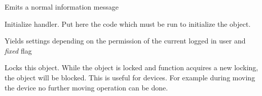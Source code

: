 \documentclass[letterpaper,10pt,english]{sphinxmanual}
\begin{document}
\begin{fulllineitems}

\begin{fulllineitems}
\label{command:pyfrid.core.command.BaseThreadedCommand.has_info}
\end{fulllineitems}


\begin{fulllineitems}
\label{command:pyfrid.core.command.BaseThreadedCommand.has_warning}
\end{fulllineitems}


\begin{fulllineitems}
\label{command:pyfrid.core.command.BaseThreadedCommand.info}
Emits a normal information message

\end{fulllineitems}


\begin{fulllineitems}
\label{command:pyfrid.core.command.BaseThreadedCommand.initialize}
Initialize handler. Put here the code which must be run to initialize the object.

\end{fulllineitems}


\begin{fulllineitems}
\label{command:pyfrid.core.command.BaseThreadedCommand.iterate_settings}
Yields settings depending on the permission of the current logged in user and \emph{fixed} flag

\end{fulllineitems}


\begin{fulllineitems}
\label{command:pyfrid.core.command.BaseThreadedCommand.lock}
Locks this object.
While the object is locked and function acquires a new locking, the object will be blocked.
This is useful for devices. For example during moving the device no further moving operation can be done.


\end{fulllineitems}
\end{fulllineitems}
\end{document}
